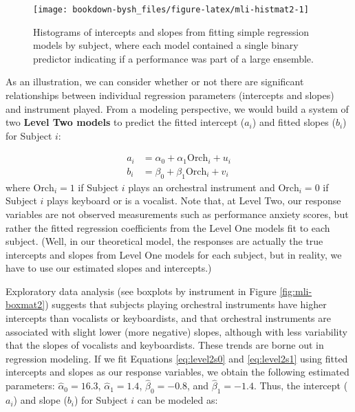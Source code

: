 \documentclass[
]{krantz}
\begin{document}
\begin{figure}

{\centering \texttt{[image: bookdown-bysh\_files/figure-latex/mli-histmat2-1]} 

}

\caption{Histograms of intercepts and slopes from fitting simple regression models by subject, where each model contained a single binary predictor indicating if a performance was part of a large ensemble.}\label{fig:mli-histmat2}
\end{figure}

As an illustration, we can consider whether or not there are significant relationships between individual regression parameters (intercepts and slopes) and instrument played. From a modeling perspective, we would build a system of two \textbf{Level Two models}  to predict the fitted intercept (\(a_{i}\)) and fitted slopes (\(b_{i}\)) for Subject \(i\):

\begin{align}
a_{i} & =  \alpha_{0}+\alpha_{1}\textrm{Orch}_{i}+u_{i}
\label{eq:level2s0}  \\
b_{i} & =  \beta_{0}+\beta_{1}\textrm{Orch}_{i}+v_{i}
\label{eq:level2s1}
\end{align}
where \(\textrm{Orch}_{i}=1\) if Subject \(i\) plays an orchestral instrument and \(\textrm{Orch}_{i}=0\) if Subject \(i\) plays keyboard or is a vocalist. Note that, at Level Two, our response variables are not observed measurements such as performance anxiety scores, but rather the fitted regression coefficients from the Level One models fit to each subject. (Well, in our theoretical model, the responses are actually the true intercepts and slopes from Level One models for each subject, but in reality, we have to use our estimated slopes and intercepts.)

Exploratory data analysis (see boxplots by instrument in Figure \ref{fig:mli-boxmat2}) suggests that subjects playing orchestral instruments have higher intercepts than vocalists or keyboardists, and that orchestral instruments are associated with slight lower (more negative) slopes, although with less variability that the slopes of vocalists and keyboardists. These trends are borne out in regression modeling. If we fit Equations \eqref{eq:level2s0} and \eqref{eq:level2s1} using fitted intercepts and slopes as our response variables, we obtain the following estimated parameters: \(\hat{\alpha}_{0}=16.3\), \(\hat{\alpha}_{1}=1.4\), \(\hat{\beta}_{0}=-0.8\), and \(\hat{\beta}_{1}=-1.4\). Thus, the intercept (\(a_{i}\)) and slope (\(b_{i}\)) for Subject \(i\) can be modeled as:
\end{document}

